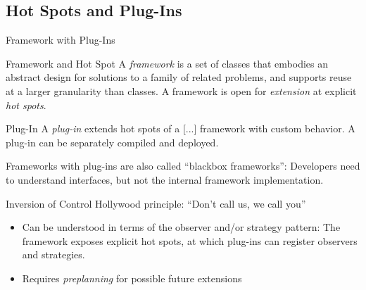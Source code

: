 \subsection{Hot Spots and Plug-Ins}
\begin{frame}{Framework with Plug-Ins}
	\begin{mycolumns}[widths={50,50}]
		\begin{definition}{Framework and Hot Spot }
			A \emph{framework} is a set of classes that embodies an abstract design for solutions to a family of related problems, and supports reuse at a larger granularity than classes. A framework is open for \emph{extension} at explicit \emph{hot spots}.				
		\end{definition}
		\begin{definition}{Plug-In }
			A \emph{plug-in} extends hot spots of a [...] framework with custom behavior. A plug-in can be separately compiled and deployed.	
		\end{definition}
		\begin{note}{}
			Frameworks with plug-ins are also called "`blackbox frameworks"': Developers need to understand interfaces, but not the internal framework implementation.
		\end{note}
	\mynextcolumn
		\vspace{-0.7cm}
		\begin{note}{Inversion of Control}
			Hollywood principle: ``Don't call us, we call you''\\
			\centering 
		\end{note}
		\begin{note}{}
			\begin{itemize}
				\item Can be understood in terms of the observer and/or strategy pattern: The framework exposes explicit hot spots, at which plug-ins can register observers and strategies.
				\item Requires \emph{preplanning} for possible future extensions
			\end{itemize}
		\end{note}
	\end{mycolumns}
\end{frame}

